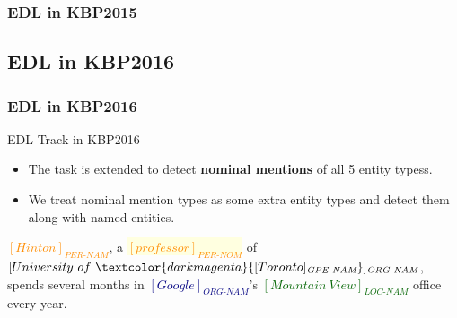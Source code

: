 \documentclass{beamer}
\begin{document}
\begin{frame}
\frametitle{EDL in KBP2015}
\begin{table}
	\caption{\scriptsize Entity Discovery Performance of our method on the KBP2015 EDL evaluation data, with comparison to the best systems in KBP2015 official evaluation.}
	\label{tbl:kbp2015cmp}
\end{table}
\end{frame}


\subsection{EDL in KBP2016}

\begin{frame}
\frametitle{EDL in KBP2016}
\begin{block}{EDL Track in KBP2016 \parencite{kbpoverview2016}}
\begin{itemize}
	\item The task is extended to detect \textbf{nominal mentions} of all 5 entity typess. 
	\item We treat nominal mention types as some extra entity types and detect them along with named entities.  
\end{itemize}
\end{block}
\begin{example}
	\textcolor{darkorange}{$[Hinton]_{\textit{PER-NAM}}$}, 
	a \colorbox{lightyellow}{\textcolor{darkorange}{$[professor]_{\textit{PER-NOM}}$}} of \textcolor{navy}{$[University\ of\ \textcolor{darkmagenta}{[Toronto]_{\textit{GPE-NAM}}}]_{\textit{ORG-NAM}}$}, 
	spends several months in \textcolor{navy}{$[Google]_{\textit{ORG-NAM}}$}'s 
	\textcolor{darkgreen}{$[Mountain\ View]_{\textit{LOC-NAM}}$} office every year.
\end{example}
\end{frame}
\end{document}
